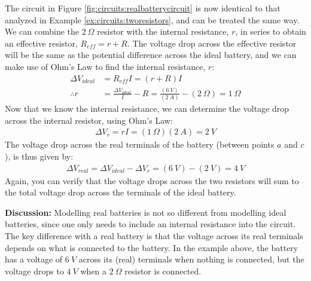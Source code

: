 \begin{example}
The circuit in Figure \ref{fig:circuits:realbatterycircuit} is now identical to that analyzed in Example \ref{ex:circuits:tworesistors}, and can be treated the same way. We can combine the $\SI{2}{\Omega}$ resistor with the internal resistance, $r$, in series to obtain an effective resistor, $R_{eff}=r+R$. The voltage drop across the effective resistor will be the same as the potential difference across the ideal battery, and we can make use of Ohm's Law to find the internal resistance, $r$:
\begin{align*}
\Delta V_{ideal}&= R_{eff}I=(r+R)I\\
\therefore r &= \frac{\Delta V_{ideal}}{I}-R=\frac{(\SI{6}{V})}{(\SI{2}{A})}-(\SI{2}{\Omega})=\SI{1}{\Omega}
\end{align*}
Now that we know the internal resistance, we can determine the voltage drop across the internal resistor, using Ohm's Law:
\begin{align*}
\Delta V_r = rI=(\SI{1}{\Omega})(\SI{2}{A})=\SI{2}{V}
\end{align*}
The voltage drop across the real terminals of the battery (between points $a$ and $c$), is thus given by:
\begin{align*}
\Delta V_{real}=\Delta V_{ideal}-\Delta V_r=(\SI{6}{V})-(\SI{2}{V})=\SI{4}{V}
\end{align*}
Again, you can verify that the voltage drops across the two resistors will sum to the total voltage drop across the terminals of the ideal battery. 


\textbf{Discussion: } Modelling real batteries is not so different from modelling ideal batteries, since one only needs to include an internal resistance into the circuit. The key difference with a real battery is that the voltage across its real terminals depends on what is connected to the battery. In the example above, the battery has a voltage of $\SI{6}{V}$ across its (real) terminals when nothing is connected, but the voltage drops to $\SI{4}{V}$ when a $\SI{2}{\Omega}$ resistor is connected.
\end{example}


